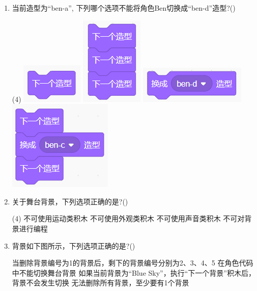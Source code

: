 \documentclass[10pt, a4paper]{article}
\begin{document}
\begin{enumerate}
        \newpage
        \item 当前造型为“ben-a”, 下列哪个选项不能将角色Ben切换成“ben-d”造型?(\qquad)
        \begin{tasks}(4)
            \task \includegraphics[width=.1\textwidth]{6a.png}
            \task \includegraphics[width=.06\textwidth]{6b.png}
            \task \includegraphics[width=.15\textwidth]{6c.png}
            \task \includegraphics[width=.1\textwidth]{6d.png}
        \end{tasks}

        \item 关于舞台背景，下列选项正确的是?(\qquad)
        \begin{tasks}(4)
            \task 不可使用运动类积木
            \task 不可使用外观类积木
            \task 不可使用声音类积木
            \task 不可对背景进行编程
        \end{tasks}

        \item 背景如下图所示，下列选项正确的是?(\qquad)
        \begin{tasks}
            \task 当删除背景编号为1的背景后，剩下的背景编号分别为2、3、4、5
            \task 在角色代码中不能切换舞台背景
            \task 如果当前背景为“Blue Sky”，执行“下一个背景”积木后，背景不会发生切换
            \task 无法删除所有背景，至少要有1个背景
        \end{tasks}


\end{enumerate}
\end{document}
